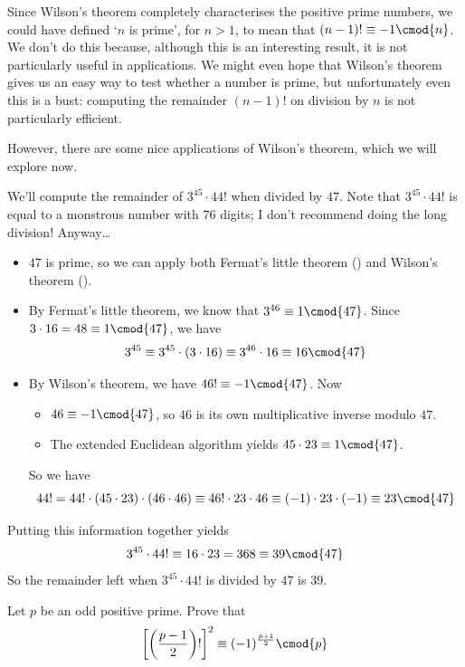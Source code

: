 Since Wilson's theorem completely characterises the positive prime numbers, we could have defined `$n$ is prime', for $n > 1$, to mean that $(n-1)! \equiv -1 \cmod{n}$. We don't do this because, although this is an interesting result, it is not particularly useful in applications. We might even hope that Wilson's theorem gives us an easy way to test whether a number is prime, but unfortunately even this is a bust: computing the remainder $(n-1)!$ on division by $n$ is not particularly efficient.

However, there are some nice applications of Wilson's theorem, which we will explore now.

\begin{example}
We'll compute the remainder of $3^{45} \cdot 44!$ when divided by $47$. Note that $3^{45} \cdot 44!$ is equal to a monstrous number with $76$ digits; I don't recommend doing the long division! Anyway\dots{}
\begin{itemize} 
\item $47$ is prime, so we can apply both Fermat's little theorem () and Wilson's theorem ().
\item By Fermat's little theorem, we know that $3^{46} \equiv 1 \cmod{47}$. Since $3 \cdot 16 = 48 \equiv 1 \cmod{47}$, we have
\[ 3^{45} \equiv 3^{45} \cdot (3 \cdot 16) \equiv 3^{46} \cdot 16 \equiv 16 \cmod{47} \]
\item By Wilson's theorem, we have $46! \equiv -1 \cmod{47}$. Now
\begin{itemize}
\item $46 \equiv -1 \cmod{47}$, so $46$ is its own multiplicative inverse modulo $47$.
\item The extended Euclidean algorithm yields $45 \cdot 23 \equiv 1 \cmod{47}$.
\end{itemize}
So we have
\[ 44! = 44! \cdot (45 \cdot 23) \cdot (46 \cdot 46) \equiv 46! \cdot 23 \cdot 46 \equiv (-1) \cdot 23 \cdot (-1) \equiv 23 \cmod{47} \]
\end{itemize}
Putting this information together yields
\[ 3^{45} \cdot 44! \equiv 16 \cdot 23 = 368 \equiv 39 \cmod{47} \]
So the remainder left when $3^{45} \cdot 44!$ is divided by $47$ is $39$.
\end{example}

\begin{exercise}
Let $p$ be an odd positive prime. Prove that
\[ \left[ \left( \frac{p-1}{2} \right)! \right]^2 \equiv (-1)^{\frac{p+1}{2}} \cmod{p} \]
\end{exercise}


